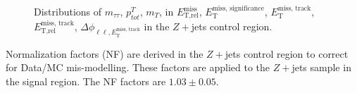 \begin{figure}[!h]
{  }\hfill
  \hfill
  \hfill
{\caption{Distributions of $m_{\tau\tau}$, $p^T_{tot}$, $m_T$, in $\ensuremath{E_{\text{T,rel}}^{\text{miss}}}$, $\ensuremath{E_{\text{T}}^{\text{miss, significance}}}$, $\ensuremath{E_{\text{T}}^{\text{miss, track}}}$, $\ensuremath{E_{\text{T,rel}}^{\text{miss, track}}}$, $\ensuremath{\Delta\phi_{\ell\ell,E_{\text{T}}^{\text{miss, track}}}}$ in the $Z+$jets control region.
\label{fig:DYCR3}}}
\end{figure}

Normalization factors (NF) are derived in the $Z+$jets control region to correct for Data/MC mis-modelling. These factors are applied to the $Z+$jets sample in the signal region. The NF factors are $1.03 \pm 0.05$. 

